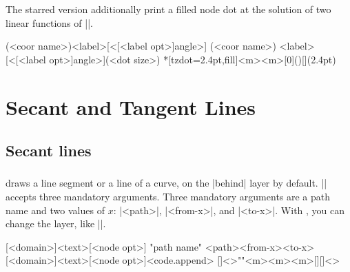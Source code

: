 The starred version \icmd{\tzLFnXpoint*} additionally print a filled node dot at the solution of two linear functions of |\x|.

\begin{tzdef}
\tzLFnXpoint*{<\fn>}{<\fn>}
\tzLFnXpoint*{<\fn>}{<\fn>}(<coor name>){<label>}[<[<label opt>]angle>]
\tzLFnXpoint*[<opt>]{<\fn>}{<\fn>}(<coor name>)
            {<label>}[<[<label opt>]angle>](<dot size>)
 *[tzdot=2.4pt,fill]{<m>}{<m>}[0](){}[](2.4pt)
\end{tzdef}

\begin{tzcode}{.3}
{}
\end{tzcode}



\chapter{Secant and Tangent Lines}
\label{c:tangent}

\section{Secant lines}
\label{s:secant}

\subsection{\protect\cmd{\tzsecantat}}
\label{ss:tzsecantat}

\icmd{\tzsecantat} draws a line segment or a  line of a curve, on the |behind| layer by default.
|\tzsecantat| accepts three mandatory arguments. 
Three mandatory arguments are a path name and two values of $x$: |{<path>}|, |{<from-x>}|, and |{<to-x>}|.
With \icmd{\settzsecantlayer}, you can change the layer, like ||.

\begin{tzdef}
[<domain>]{<text>}[<node opt>]
"path name"
           {<path>}{<from-x>}{<to-x>}[<domain>]{<text>}[<node opt>]<code.append>
  []<>""{<m>}{<m>}{<m>}[]{}[]<>
\end{tzdef}


